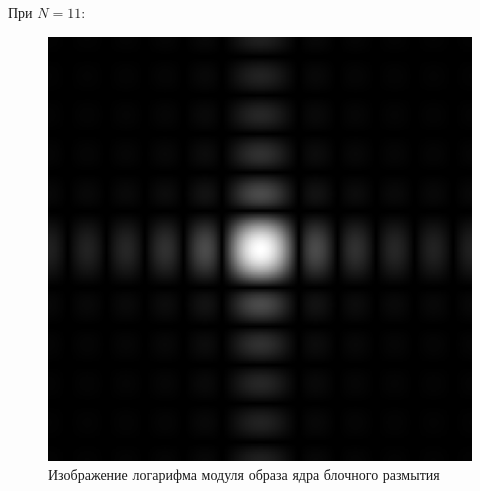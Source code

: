\documentclass[a4paper]{article}
\begin{document}
При $N = 11$:

\begin{figure}[H]
    \centering
    \includegraphics[width=0.51\linewidth]{2/11_abs_fourier_log_norm_block.png}
    \caption{Изображение логарифма модуля образа ядра блочного размытия}
\end{figure}\
\end{document}
